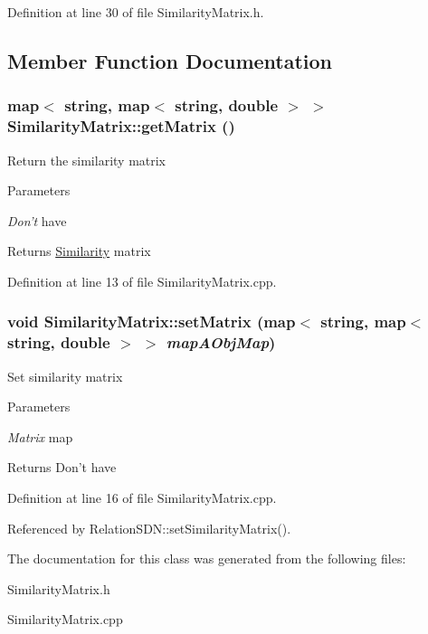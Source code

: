 Definition at line 30 of file SimilarityMatrix.h.

\subsection{Member Function Documentation}
\hypertarget{classSimilarityMatrix_ad23f50845db414b67e3b37e5717c5633}{
\subsubsection[{getMatrix}]{\setlength{\rightskip}{0pt plus 5cm}map$<$ string, map$<$ string, double $>$ $>$ SimilarityMatrix::getMatrix ()}}
\label{classSimilarityMatrix_ad23f50845db414b67e3b37e5717c5633}
Return the similarity matrix 
\begin{DoxyParams}{Parameters}
\item[{\em Don't}]have \end{DoxyParams}
\begin{DoxyReturn}{Returns}
\hyperlink{classSimilarity}{Similarity} matrix 
\end{DoxyReturn}


Definition at line 13 of file SimilarityMatrix.cpp.\hypertarget{classSimilarityMatrix_a5ee88b8eebc7987f7b5fd7ce04100b9d}{
\subsubsection[{setMatrix}]{\setlength{\rightskip}{0pt plus 5cm}void SimilarityMatrix::setMatrix (map$<$ string, map$<$ string, double $>$ $>$ {\em mapAObjMap})}}
\label{classSimilarityMatrix_a5ee88b8eebc7987f7b5fd7ce04100b9d}
Set similarity matrix 
\begin{DoxyParams}{Parameters}
\item[{\em Matrix}]map \end{DoxyParams}
\begin{DoxyReturn}{Returns}
Don't have 
\end{DoxyReturn}


Definition at line 16 of file SimilarityMatrix.cpp.

Referenced by RelationSDN::setSimilarityMatrix().

The documentation for this class was generated from the following files:\begin{DoxyCompactItemize}
\item 
SimilarityMatrix.h\item 
SimilarityMatrix.cpp\end{DoxyCompactItemize}
